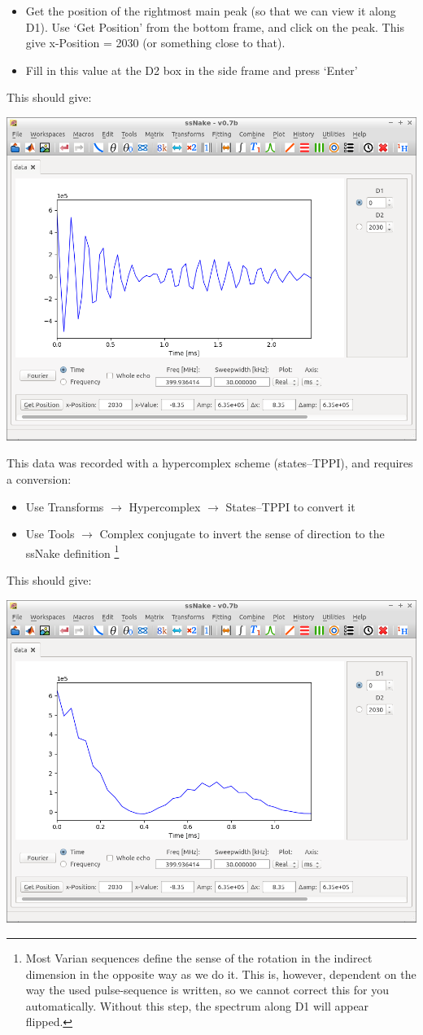 \documentclass[11pt,a4paper]{article}
\begin{document}
\begin{itemize}
  \item Get the position of the rightmost main peak (so that we can view it along D1). Use `Get
	 Position' from the bottom frame, and click on the peak. This give x-Position = 2030 (or
	 something close to that).
  \item Fill in this value at the D2 box in the side frame and press `Enter'
\end{itemize}
This should give:
\begin{center}
\includegraphics[width=0.7\linewidth]{Figs/Fig3.png}
\end{center}
This data was recorded with a hypercomplex scheme (states--TPPI), and requires a conversion:

\begin{itemize}
  \item Use Transforms $\longrightarrow$ Hypercomplex $\longrightarrow$ States--TPPI to convert it
	\item Use Tools $\longrightarrow$ Complex conjugate to invert the sense of direction to the
	  ssNake definition \footnote{Most Varian sequences define the sense of the rotation in the
	  indirect dimension in the opposite way as we do it. This is, however, dependent on the way the
	used pulse-sequence is written, so we cannot correct this for you automatically. Without this
 step, the spectrum along D1 will appear flipped. }
\end{itemize}
This should give:
\begin{center}
\includegraphics[width=0.7\linewidth]{Figs/Fig4.png}
\end{center}
\end{document}
